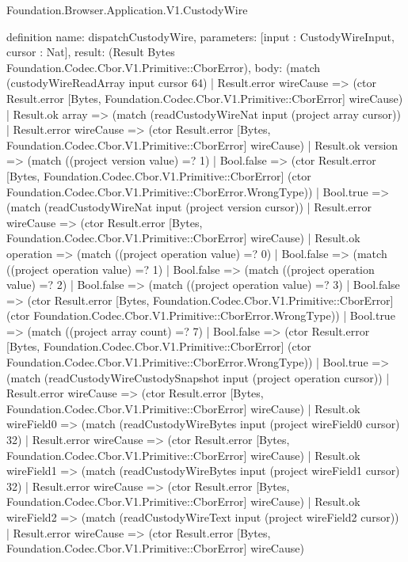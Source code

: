 \begin{lexlean}{Foundation.Browser.Application.V1.CustodyWire}
\begin{semanticmodule}
definition{
  name: dispatchCustodyWire,
  parameters: [input : CustodyWireInput, cursor : Nat],
  result: (Result Bytes Foundation.Codec.Cbor.V1.Primitive::CborError),
  body: (match (custodyWireReadArray input cursor 64)
    | Result.error wireCause => (ctor Result.error [Bytes, Foundation.Codec.Cbor.V1.Primitive::CborError] wireCause)
    | Result.ok array => (match (readCustodyWireNat input (project array cursor))
      | Result.error wireCause => (ctor Result.error [Bytes, Foundation.Codec.Cbor.V1.Primitive::CborError] wireCause)
      | Result.ok version => (match ((project version value) =? 1)
        | Bool.false => (ctor Result.error [Bytes, Foundation.Codec.Cbor.V1.Primitive::CborError] (ctor Foundation.Codec.Cbor.V1.Primitive::CborError.WrongType))
        | Bool.true => (match (readCustodyWireNat input (project version cursor))
          | Result.error wireCause => (ctor Result.error [Bytes, Foundation.Codec.Cbor.V1.Primitive::CborError] wireCause)
          | Result.ok operation => (match ((project operation value) =? 0)
            | Bool.false => (match ((project operation value) =? 1)
              | Bool.false => (match ((project operation value) =? 2)
                | Bool.false => (match ((project operation value) =? 3)
                  | Bool.false => (ctor Result.error [Bytes, Foundation.Codec.Cbor.V1.Primitive::CborError] (ctor Foundation.Codec.Cbor.V1.Primitive::CborError.WrongType))
                  | Bool.true => (match ((project array count) =? 7)
                    | Bool.false => (ctor Result.error [Bytes, Foundation.Codec.Cbor.V1.Primitive::CborError] (ctor Foundation.Codec.Cbor.V1.Primitive::CborError.WrongType))
                    | Bool.true => (match (readCustodyWireCustodySnapshot input (project operation cursor))
                      | Result.error wireCause => (ctor Result.error [Bytes, Foundation.Codec.Cbor.V1.Primitive::CborError] wireCause)
                      | Result.ok wireField0 => (match (readCustodyWireBytes input (project wireField0 cursor) 32)
                        | Result.error wireCause => (ctor Result.error [Bytes, Foundation.Codec.Cbor.V1.Primitive::CborError] wireCause)
                        | Result.ok wireField1 => (match (readCustodyWireBytes input (project wireField1 cursor) 32)
                          | Result.error wireCause => (ctor Result.error [Bytes, Foundation.Codec.Cbor.V1.Primitive::CborError] wireCause)
                          | Result.ok wireField2 => (match (readCustodyWireText input (project wireField2 cursor))
                            | Result.error wireCause => (ctor Result.error [Bytes, Foundation.Codec.Cbor.V1.Primitive::CborError] wireCause)
}
\end{semanticmodule}
\end{lexlean}
